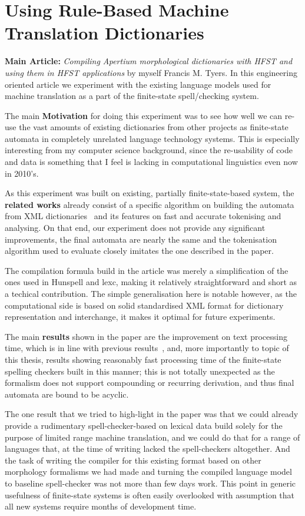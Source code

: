 \documentclass[officiallayout]{unihelcompling}
\begin{document}
\section{Using Rule-Based Machine Translation Dictionaries}
\label{sec:apertium}

\textbf{Main Article:} \emph{Compiling Apertium morphological dictionaries with
HFST and using them in HFST applications} by myself Francis M. Tyers. In this
engineering oriented article we experiment with the existing language models
used for machine translation as a part of the finite-state spell\-/checking
system.

The main \textbf{Motivation} for doing this experiment was to see how well we
can re-use the vast amounts of existing dictionaries from other projects as
finite-state automata in completely unrelated language technology systems.
This is especially interesting from my computer science background, since
the re-usability of code and data is something that I feel is lacking in
computational linguistics even now in 2010's.

As this experiment was built on existing, partially finite-state-based system,
the \textbf{related works} already consist of a specific algorithm on building
the automata from XML dictionaries~\citep{rojas2005construccion} and its
features on fast and accurate tokenising and analysing. On that end,
our experiment does not provide any significant improvements, the final
automata are nearly the same and the tokenisation algorithm used to evaluate
closely imitates the one described in the paper.

The compilation formula build in the article was merely a simplification of
the ones used in Hunspell and lexc, making it relatively straightforward and
short as a techical contribution. The simple generalisation here is notable
however, as the computational side is based on solid standardised XML
format for dictionary representation and interchange, it makes it optimal
for future experiments.

The main \textbf{results} shown in the paper are the improvement on text
processing time, which is in line with previous
results~\citep{silfverberg2009hfst}, and, more importantly to topic of this
thesis, results showing reasonably fast processing time of the finite-state
spelling checkers built in this manner; this is not totally unexpected as the
formalism does not support compounding or recurring derivation, and thus final
automata are bound to be acyclic. 

The one result that we tried to high-light in the paper was that we could
already provide a rudimentary spell-checker-based on lexical data build solely
for the purpose of limited range machine translation, and we could do that for
a range of languages that, at the time of writing lacked the spell-checkers
altogether. And the task of writing the compiler for this existing format
based on other morphology formalisms we had made and turning the compiled
language model to baseline spell-checker was not more than few days work. This
point in generic usefulness of finite-state systems is often easily overlooked
with assumption that all new systems require months of development time.
\end{document}
